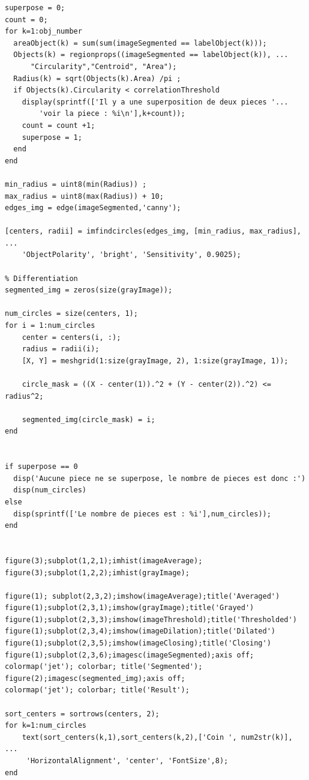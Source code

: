 \documentclass[11pt, openright]{book}
\begin{document}
\begin{lstlisting}
superpose = 0;
count = 0;
for k=1:obj_number
  areaObject(k) = sum(sum(imageSegmented == labelObject(k)));
  Objects(k) = regionprops((imageSegmented == labelObject(k)), ...
      "Circularity","Centroid", "Area");
  Radius(k) = sqrt(Objects(k).Area) /pi ;
  if Objects(k).Circularity < correlationThreshold
    display(sprintf(['Il y a une superposition de deux pieces '...
        'voir la piece : %i\n'],k+count));
    count = count +1;
    superpose = 1;
  end
end

min_radius = uint8(min(Radius)) ;
max_radius = uint8(max(Radius)) + 10;
edges_img = edge(imageSegmented,'canny');

[centers, radii] = imfindcircles(edges_img, [min_radius, max_radius], ...
    'ObjectPolarity', 'bright', 'Sensitivity', 0.9025);

% Differentiation
segmented_img = zeros(size(grayImage));

num_circles = size(centers, 1);
for i = 1:num_circles
    center = centers(i, :);
    radius = radii(i);
    [X, Y] = meshgrid(1:size(grayImage, 2), 1:size(grayImage, 1));
    
    circle_mask = ((X - center(1)).^2 + (Y - center(2)).^2) <= radius^2;
    
    segmented_img(circle_mask) = i;
end


if superpose == 0
  disp('Aucune piece ne se superpose, le nombre de pieces est donc :')
  disp(num_circles)
else
  disp(sprintf(['Le nombre de pieces est : %i'],num_circles));
end


figure(3);subplot(1,2,1);imhist(imageAverage);
figure(3);subplot(1,2,2);imhist(grayImage);

figure(1); subplot(2,3,2);imshow(imageAverage);title('Averaged')
figure(1);subplot(2,3,1);imshow(grayImage);title('Grayed')
figure(1);subplot(2,3,3);imshow(imageThreshold);title('Thresholded')
figure(1);subplot(2,3,4);imshow(imageDilation);title('Dilated')
figure(1);subplot(2,3,5);imshow(imageClosing);title('Closing')
figure(1);subplot(2,3,6);imagesc(imageSegmented);axis off; 
colormap('jet'); colorbar; title('Segmented');
figure(2);imagesc(segmented_img);axis off; 
colormap('jet'); colorbar; title('Result');

sort_centers = sortrows(centers, 2);
for k=1:num_circles
    text(sort_centers(k,1),sort_centers(k,2),['Coin ', num2str(k)], ...
     'HorizontalAlignment', 'center', 'FontSize',8);
end

\end{lstlisting}
\end{document}
